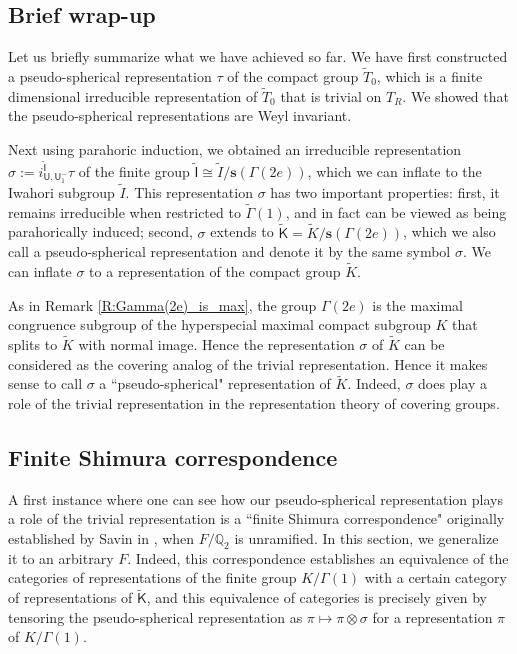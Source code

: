 \documentclass[10pt, letterpaper]{amsart}
\theoremstyle{plain}
\theoremstyle{definition}
\numberwithin{equation}{section}
\newcommand{\It}{\widetilde{I}}
\newcommand{\Kt}{\widetilde{K}}
\newcommand{\Tt}{\widetilde{T}}
\newcommand{\Gammat}{\widetilde{\Gamma}}
\newcommand{\s}{\mathbf{s}}
\newcommand{\Uf}{\mathsf{U}}
\newcommand{\Ift}{\widetilde{\mathsf{I}}}
\newcommand{\Kft}{\widetilde{\mathsf{K}}}
\begin{document}

\subsection{Brief wrap-up}


Let us briefly summarize what we have achieved so far. We have first constructed a pseudo-spherical representation $\tau$ of the compact group $\Tt_0$, which is a finite dimensional irreducible representation of $\Tt_0$ that is trivial on $T_R$. We showed that the pseudo-spherical representations are Weyl invariant. 

Next using parahoric induction, we obtained an irreducible representation $\sigma:=i_{\Uf, \Uf_1^-}^{\Ift}\tau$ of the finite group $\Ift\cong \It/\s(\Gamma(2e))$, which we can inflate to the Iwahori subgroup $\It$. This representation $\sigma$ has two important properties: first, it remains irreducible when restricted to $\Gammat(1)$, and in fact can be viewed as being parahorically induced; second, $\sigma$ extends to $\Kft=\Kt/\s(\Gamma(2e))$, which we also call a pseudo-spherical representation and denote it by the same symbol $\sigma$. We can inflate $\sigma$ to a representation of the compact group $\Kt$. 

As in Remark \ref{R:Gamma(2e)_is_max}, the group $\Gamma(2e)$ is the maximal congruence subgroup of the hyperspecial maximal compact subgroup $K$ that splits to $\Kt$ with normal image. Hence the representation $\sigma$ of $\Kt$ can be considered as the covering analog of the trivial representation. Hence it makes sense to call $\sigma$ a ``pseudo-spherical" representation of $\Kt$. Indeed, $\sigma$ does play a role of the trivial representation in the representation theory of covering groups.



\subsection{Finite Shimura correspondence}\label{SS:finite_Shimura}


A first instance where one can see how our pseudo-spherical representation plays a role of the trivial representation is a ``finite Shimura correspondence" originally established by Savin in \cite[Theorem 4.1]{S12}, when $F/\mathbb{Q}_{2}$ is unramified. In this section, we generalize it to an arbitrary $F$. Indeed, this correspondence establishes an equivalence of the categories of representations of the finite group $K\slash\Gamma(1)$ with a certain category of representations of $\Kft$, and this equivalence of categories is precisely given by tensoring the pseudo-spherical representation as $\pi\mapsto \pi\otimes\sigma$ for a representation $\pi$ of $K\slash\Gamma(1)$.
\end{document}
